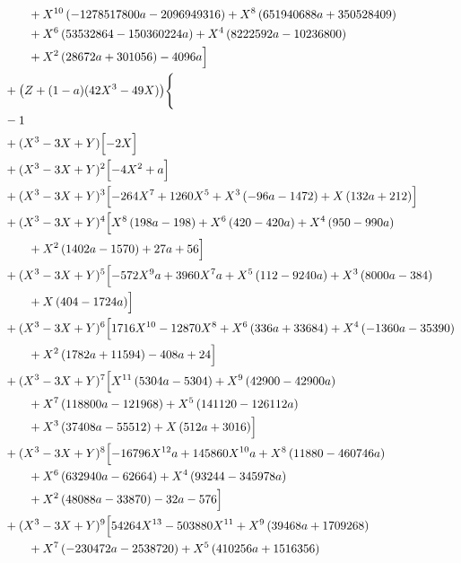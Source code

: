 \begin{align*}
&\qquad + X^{10} \left(- 1278517800 a - 2096949316\right) + X^{8} \left(651940688 a + 350528409\right)\\
&\qquad + X^{6} \left(53532864 - 150360224 a\right) + X^{4} \left(8222592 a - 10236800\right)\\
&\qquad + X^{2} \left(28672 a + 301056\right) - 4096 a\Bigr]\\
&{}+\bigl(Z+(1-a)(42X^3-49X)\bigr)\Biggl\{\\
&{}- 1\\
&{}+(X^3-3X+Y)\Bigl[- 2 X\Bigr]\\
&{}+(X^3-3X+Y)^{2}\Bigl[- 4 X^{2} + a\Bigr]\\
&{}+(X^3-3X+Y)^{3}\Bigl[- 264 X^{7} + 1260 X^{5} + X^{3} \left(- 96 a - 1472\right) + X \left(132 a + 212\right)\Bigr]\\
&{}+(X^3-3X+Y)^{4}\Bigl[X^{8} \left(198 a - 198\right) + X^{6} \left(420 - 420 a\right) + X^{4} \left(950 - 990 a\right)\\
&\qquad + X^{2} \left(1402 a - 1570\right) + 27 a + 56\Bigr]\\
&{}+(X^3-3X+Y)^{5}\Bigl[- 572 X^{9} a + 3960 X^{7} a + X^{5} \left(112 - 9240 a\right) + X^{3} \left(8000 a - 384\right)\\
&\qquad + X \left(404 - 1724 a\right)\Bigr]\\
&{}+(X^3-3X+Y)^{6}\Bigl[1716 X^{10} - 12870 X^{8} + X^{6} \left(336 a + 33684\right) + X^{4} \left(- 1360 a - 35390\right)\\
&\qquad + X^{2} \left(1782 a + 11594\right) - 408 a + 24\Bigr]\\
&{}+(X^3-3X+Y)^{7}\Bigl[X^{11} \left(5304 a - 5304\right) + X^{9} \left(42900 - 42900 a\right)\\
&\qquad + X^{7} \left(118800 a - 121968\right) + X^{5} \left(141120 - 126112 a\right)\\
&\qquad + X^{3} \left(37408 a - 55512\right) + X \left(512 a + 3016\right)\Bigr]\\
&{}+(X^3-3X+Y)^{8}\Bigl[- 16796 X^{12} a + 145860 X^{10} a + X^{8} \left(11880 - 460746 a\right)\\
&\qquad + X^{6} \left(632940 a - 62664\right) + X^{4} \left(93244 - 345978 a\right)\\
&\qquad + X^{2} \left(48088 a - 33870\right) - 32 a - 576\Bigr]\\
&{}+(X^3-3X+Y)^{9}\Bigl[54264 X^{13} - 503880 X^{11} + X^{9} \left(39468 a + 1709268\right)\\
&\qquad + X^{7} \left(- 230472 a - 2538720\right) + X^{5} \left(410256 a + 1516356\right)\\

\end{align*}
